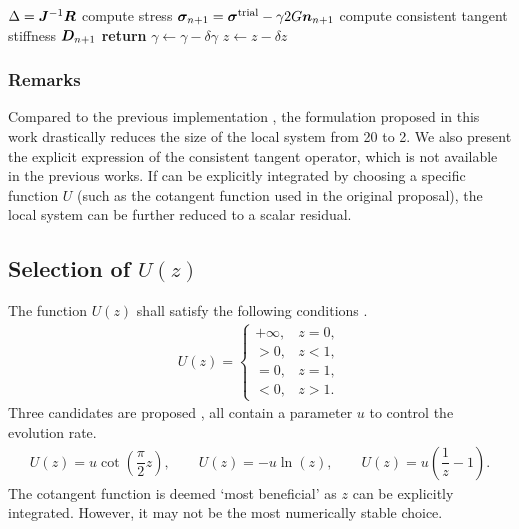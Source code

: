 \begin{breakablealgorithm}
\begin{algorithmic}[1]
        \State $\Delta=\bm{J}^{-1}\bm{R}$
        \State compute stress $\bm{\sigma}_{n+1}=\bm{\sigma}^\text{trial}-\gamma2G\bm{n}_{n+1}$
        \State compute consistent tangent stiffness $\bm{D}_{n+1}$
        \State \textbf{return}
        \EndIf
        \State $\gamma\leftarrow\gamma-\delta\gamma$
        \State $z\leftarrow{}z-\delta{}z$
        \EndWhile
    \end{algorithmic}
\end{breakablealgorithm}
\subsubsection{Remarks}
Compared to the previous implementation \citep{Fincato2017,Anjiki2019}, the formulation proposed in this work drastically reduces the size of the local system from \num{20} to \num{2}.
We also present the explicit expression of the consistent tangent operator, which is not available in the previous works.
If  can be explicitly integrated by choosing a specific function $U$ (such as the cotangent function used in the original proposal), the local system can be further reduced to a scalar residual.
\subsection{Selection of $U\left(z\right)$}
The function $U\left(z\right)$ shall satisfy the following conditions \citep[see, e.g.,][\S~2.3 for details]{Hashiguchi2024}.
\begin{gather}
    U\left(z\right)=\left\{
    \begin{array}{ll}
        +\infty, & z=0, \\
        >0,      & z<1, \\
        =0,      & z=1, \\
        <0,      & z>1.
    \end{array}\right.
\end{gather}
Three candidates are proposed \citep{Hashiguchi2017}, all contain a parameter $u$ to control the evolution rate.
\begin{gather}
    U\left(z\right)=u\cot\left(\dfrac{\pi}{2}z\right),\qquad
    U\left(z\right)=-u\ln\left(z\right),\qquad
    U\left(z\right)=u\left(\dfrac{1}{z}-1\right).
\end{gather}
The cotangent function is deemed `most beneficial' as $z$ can be explicitly integrated.
However, it may not be the most numerically stable choice.

